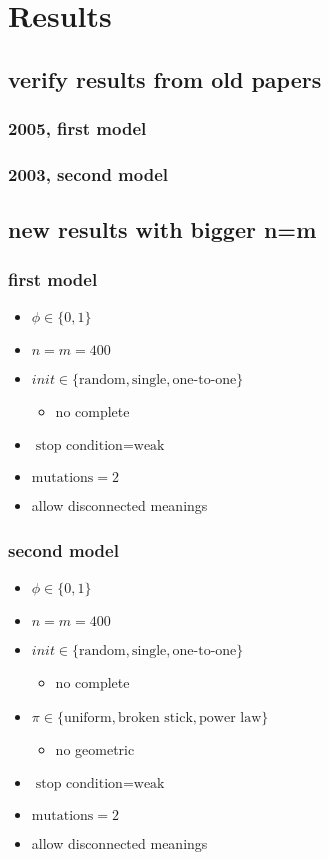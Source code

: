 \chapter{Results}

\section{verify results from old papers}
\subsection{2005, first model}
\subsection{2003, second model}
\section{new results with bigger n=m}
\subsection{first model}
\begin{itemize}
\item $\phi \in \{0,1\}$
\item $n=m=400$
\item $init \in \{\text{random},\text{single},\text{one-to-one}\}$
  \begin{itemize}
  \item no complete
  \end{itemize}
\item $\text{stop condition} = \text{weak}$
\item $\text{mutations} = 2$
\item allow disconnected meanings
\end{itemize}
\subsection{second model}
\begin{itemize}
\item $\phi \in \{0,1\}$
\item $n=m=400$
\item $init \in \{\text{random},\text{single},\text{one-to-one}\}$
  \begin{itemize}
  \item no complete
  \end{itemize}
\item $\pi \in \{\text{uniform},\text{broken stick},\text{power law}\}$
  \begin{itemize}
  \item no geometric
  \end{itemize}
\item $\text{stop condition} = \text{weak}$
\item $\text{mutations} = 2$
\item allow disconnected meanings
\end{itemize}

